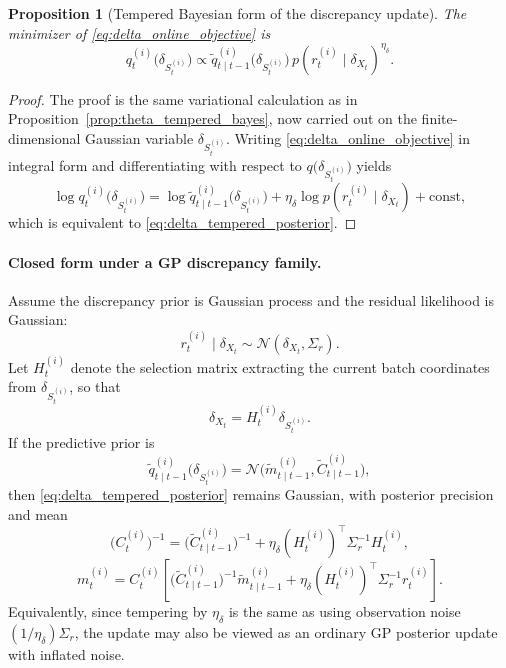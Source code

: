 \documentclass{article}
\newtheorem{proposition}{Proposition}
\begin{document}
\begin{proposition}[Tempered Bayesian form of the discrepancy update]
\label{prop:delta_tempered_bayes}
The minimizer of \eqref{eq:delta_online_objective} is
\begin{equation}
q_t^{(i)}\!\big(\delta_{S_t^{(i)}}\big)
\propto
\widetilde q_{t\mid t-1}^{(i)}\!\big(\delta_{S_t^{(i)}}\big)\,
p(r_t^{(i)}\mid \delta_{X_t})^{\eta_\delta}.
\label{eq:delta_tempered_posterior}
\end{equation}
\end{proposition}

\begin{proof}
The proof is the same variational calculation as in Proposition~\ref{prop:theta_tempered_bayes}, now carried out on the finite-dimensional Gaussian variable $\delta_{S_t^{(i)}}$. Writing \eqref{eq:delta_online_objective} in integral form and differentiating with respect to $q\!\big(\delta_{S_t^{(i)}}\big)$ yields
\[
\log q_t^{(i)}\!\big(\delta_{S_t^{(i)}}\big)
=
\log \widetilde q_{t\mid t-1}^{(i)}\!\big(\delta_{S_t^{(i)}}\big)
+
\eta_\delta \log p(r_t^{(i)}\mid \delta_{X_t})
+
\mathrm{const},
\]
which is equivalent to \eqref{eq:delta_tempered_posterior}.
\end{proof}

\paragraph{Closed form under a GP discrepancy family.}
Assume the discrepancy prior is Gaussian process and the residual likelihood is Gaussian:
\begin{equation}
r_t^{(i)} \mid \delta_{X_t}
\sim
\mathcal N(\delta_{X_t}, \Sigma_r).
\label{eq:delta_residual_likelihood}
\end{equation}
Let $H_t^{(i)}$ denote the selection matrix extracting the current batch coordinates from $\delta_{S_t^{(i)}}$, so that
\begin{equation}
\delta_{X_t}
=
H_t^{(i)} \delta_{S_t^{(i)}}.
\end{equation}
If the predictive prior is
\begin{equation}
\widetilde q_{t\mid t-1}^{(i)}\!\big(\delta_{S_t^{(i)}}\big)
=
\mathcal N\!\big(
\widetilde m_{t\mid t-1}^{(i)},
\widetilde C_{t\mid t-1}^{(i)}
\big),
\label{eq:delta_predictive_prior_gaussian}
\end{equation}
then \eqref{eq:delta_tempered_posterior} remains Gaussian, with posterior precision and mean
\begin{equation}
\big(C_t^{(i)}\big)^{-1}
=
\big(\widetilde C_{t\mid t-1}^{(i)}\big)^{-1}
+
\eta_\delta
(H_t^{(i)})^\top \Sigma_r^{-1} H_t^{(i)},
\label{eq:delta_exact_precision_update}
\end{equation}
\begin{equation}
m_t^{(i)}
=
C_t^{(i)}
\left[
\big(\widetilde C_{t\mid t-1}^{(i)}\big)^{-1}\widetilde m_{t\mid t-1}^{(i)}
+
\eta_\delta
(H_t^{(i)})^\top \Sigma_r^{-1} r_t^{(i)}
\right].
\label{eq:delta_exact_mean_update}
\end{equation}
Equivalently, since tempering by $\eta_\delta$ is the same as using observation noise $(1/\eta_\delta)\Sigma_r$, the update may also be viewed as an ordinary GP posterior update with inflated noise.
\end{document}
